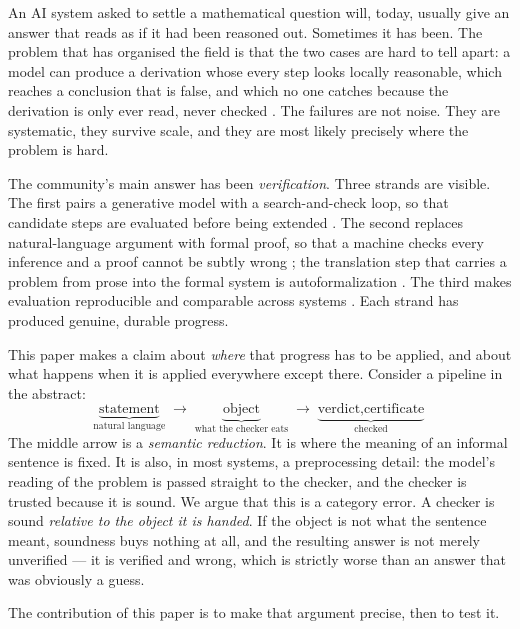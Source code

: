 \documentclass[11pt]{article}
\theoremstyle{definition}
\begin{document}
An AI system asked to settle a mathematical question will, today, usually give an
answer that reads as if it had been reasoned out. Sometimes it has been. The
problem that has organised the field is that the two cases are hard to tell
apart: a model can produce a derivation whose every step looks locally
reasonable, which reaches a conclusion that is false, and which no one catches
because the derivation is only ever read, never checked
\citep{yang2024formalreasoning}. The failures are not noise. They are
systematic, they survive scale, and they are most likely precisely where the
problem is hard.

The community's main answer has been \emph{verification}. Three strands are
visible. The first pairs a generative model with a search-and-check loop, so
that candidate steps are evaluated before being extended
\citep{lightman2024verify,uesato2022processoutcome}. The second replaces
natural-language argument with formal proof, so that a machine checks every
inference and a proof cannot be subtly wrong
\citep{demoura2021lean4,hubert2025alphaproof,trinh2024alphageometry}; the
translation step that carries a problem from prose into the formal system is
autoformalization \citep{wu2022autoformalization,jjiang2023draftsketchprove}.
The third makes evaluation reproducible and comparable across systems
\citep{zheng2022minif2f,romeraparedes2024funsearch,charton2024patternboost}.
Each strand has produced genuine, durable progress.

This paper makes a claim about \emph{where} that progress has to be applied, and
about what happens when it is applied everywhere except there. Consider a
pipeline in the abstract:
\[
  \underbrace{\text{statement}}_{\text{natural language}}
  \;\longrightarrow\;
  \underbrace{\text{object}}_{\text{what the checker eats}}
  \;\longrightarrow\;
  \underbrace{\text{verdict}, \text{certificate}}_{\text{checked}}
\]
The middle arrow is a \emph{semantic reduction}. It is where the meaning of an
informal sentence is fixed. It is also, in most systems, a preprocessing
detail: the model's reading of the problem is passed straight to the checker, and
the checker is trusted because it is sound. We argue that this is a category
error. A checker is sound \emph{relative to the object it is handed}. If the
object is not what the sentence meant, soundness buys nothing at all, and the
resulting answer is not merely unverified --- it is verified and wrong, which is
strictly worse than an answer that was obviously a guess.

The contribution of this paper is to make that argument precise, then to test it.
\end{document}
